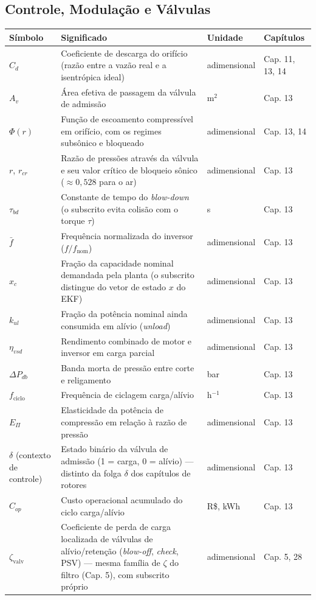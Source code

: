 \documentclass[12pt,a4paper]{article}
\numberwithin{equation}{section}
\numberwithin{table}{section}
\numberwithin{figure}{section}
\begin{document}
{{\subsection*{Controle, Modulação e Válvulas}
\begin{longtable}{>{\raggedright\arraybackslash}p{2.8cm} >{\raggedright\arraybackslash}p{5.3cm} >{\raggedright\arraybackslash}p{2.1cm} >{\raggedright\arraybackslash}p{4.2cm}}
	\toprule
	\textbf{Símbolo} & \textbf{Significado} & \textbf{Unidade} & \textbf{Capítulos} \\ \midrule
	\endhead
	$C_d$ & Coeficiente de descarga do orifício (razão entre a vazão real e a isentrópica ideal) & adimensional & Cap. 11, 13, 14 \\
	$A_v$ & Área efetiva de passagem da válvula de admissão & m$^2$ & Cap. 13 \\
	$\Phi(r)$ & Função de escoamento compressível em orifício, com os regimes subsônico e bloqueado & adimensional & Cap. 13, 14 \\
	$r$, $r_{cr}$ & Razão de pressões através da válvula e seu valor crítico de bloqueio sônico ($\approx 0{,}528$ para o ar) & adimensional & Cap. 13 \\
	$\tau_{bd}$\dag & Constante de tempo do \textit{blow-down} (o subscrito evita colisão com o torque $\tau$) & s & Cap. 13 \\
	$\bar{f}$ & Frequência normalizada do inversor ($f/f_{\text{nom}}$) & adimensional & Cap. 13 \\
	$x_c$\dag & Fração da capacidade nominal demandada pela planta (o subscrito distingue do vetor de estado $x$ do EKF) & adimensional & Cap. 13 \\
	$k_{ul}$ & Fração da potência nominal ainda consumida em alívio (\textit{unload}) & adimensional & Cap. 13 \\
	$\eta_{vsd}$ & Rendimento combinado de motor e inversor em carga parcial & adimensional & Cap. 13 \\
	$\Delta P_{db}$ & Banda morta de pressão entre corte e religamento & bar & Cap. 13 \\
	$f_{\text{ciclo}}$ & Frequência de ciclagem carga/alívio & h$^{-1}$ & Cap. 13 \\
	$E_{\Pi}$ & Elasticidade da potência de compressão em relação à razão de pressão & adimensional & Cap. 13 \\
	$\delta$ (contexto de controle)\dag & Estado binário da válvula de admissão (1 = carga, 0 = alívio) — distinto da folga $\delta$ dos capítulos de rotores & adimensional & Cap. 13 \\
	$C_{op}$ & Custo operacional acumulado do ciclo carga/alívio & R\$, kWh & Cap. 13 \\
	$\zeta_{\text{valv}}$\dag & Coeficiente de perda de carga localizada de válvulas de alívio/retenção (\textit{blow-off}, \textit{check}, PSV) — mesma família de $\zeta$ do filtro (Cap. 5), com subscrito próprio & adimensional & Cap. 5, 28 \\ \bottomrule
\end{longtable}

}}
\end{document}
